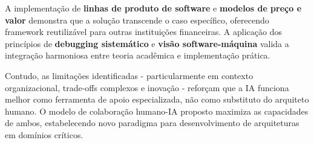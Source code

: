 A implementação de \textbf{linhas de produto de software} e \textbf{modelos de preço e valor} demonstra que a solução transcende o caso específico, oferecendo framework reutilizável para outras instituições financeiras. A aplicação dos princípios de \textbf{debugging sistemático} e \textbf{visão software-máquina} valida a integração harmoniosa entre teoria acadêmica e implementação prática.

Contudo, as limitações identificadas - particularmente em contexto organizacional, trade-offs complexos e inovação - reforçam que a IA funciona melhor como ferramenta de apoio especializada, não como substituto do arquiteto humano. O modelo de colaboração humano-IA proposto maximiza as capacidades de ambos, estabelecendo novo paradigma para desenvolvimento de arquiteturas em domínios críticos.














